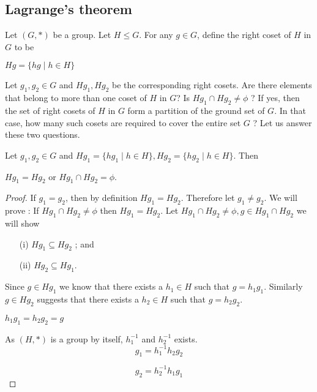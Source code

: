 \begin{observation}
\begin{definition}
\subsection{Lagrange's theorem}

Let $(G,*)$ be a group. Let $H\leq G$. For any $g\in G$, define the right coset of $H$ in $G$ to be
\begin{center}
$Hg= \{hg \mid h\in H \}$
\end{center}
 

Let $g_1,g_2\in G$ and $Hg_1,Hg_2$ be the corresponding right cosets.  Are there elements that belong to more than one coset of $H$ in $G$? Is $Hg_1\cap Hg_2 \neq \phi$ ? If yes, then the set of right cosets of $H$ in $G$ form a partition of the ground set of $G$. In that case, how many such cosets are required to cover the entire set $G$ ? Let us answer these two questions.

\begin{lemma}
\label{lag1}
Let $g_1,g_2\in G$ and $Hg_1 = \{hg_1\mid h\in H\},Hg_2 = \{hg_2\mid h\in H\}$. Then 
\begin{center}
$Hg_1=Hg_2$ or $Hg_1\cap Hg_2 = \phi$.
\end{center}
\end{lemma}
\begin{proof}
If $g_1=g_2$, then by definition $Hg_1=Hg_2$. Therefore let $g_1\neq g_2$. We will prove : If $Hg_1\cap Hg_2 \neq \phi$ then $Hg_1 = Hg_2$. Let $Hg_1\cap Hg_2 \neq \phi, g\in Hg_1\cap Hg_2$ we will show 
\begin{itemize}
\item[(i)] $Hg_1\subseteq Hg_2$ ; and
\item[(ii)] $Hg_2\subseteq Hg_1$.
\end{itemize}

Since $g\in Hg_1$ we know that there exists a $h_1\in H$ such that $g=h_1g_1$. Similarly $g\in Hg_2$ suggests that there exists a $h_2\in H$ such that $g=h_2g_2$.
\begin{center}
$h_1g_1=h_2g_2=g$
\end{center}   
As $(H,*)$ is a group by itself, $h_1^{-1}$ and $h_2^{-1}$ exists.
\begin{equation}
\label{eqn1}
g_1= h_1^{-1}h_2g_2
\end{equation}

\begin{equation}
\label{eqn2}
g_2 = h_2^{-1}h_1g_1
\end{equation}


\end{proof}
\end{definition}
\end{observation}
